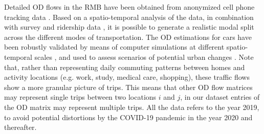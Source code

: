 Detailed OD flows in the RMB have been obtained from anonymized cell phone tracking data \citep{Calvet2020ObtencioM2019}. Based on a spatio-temporal analysis of the data, in combination with survey and ridership data \citep{PerezSans2021}, it is possible to generate a realistic modal split across the different modes of transportation. The OD estimations for cars have been robustly validated by means of computer simulations at different spatio-temporal scales \citep{ArgotaSanchez-Vaquerizo2021}, and used to assess scenarios of potential urban changes \citep{ArgotaSanchez-Vaquerizo2023LessCity-making}.
Note that, rather than representing daily commuting patterns between homes and activity locations (e.g. work, study, medical care, shopping), these traffic flows show a more granular picture of trips. This means that other OD flow matrices may represent single trips between two locations $i$ and $j$, in our dataset entries of the OD matrix may represent multiple trips. %
All the data refers to the year 2019, to avoid potential distortions by the COVID-19 pandemic in the year 2020 and thereafter.


